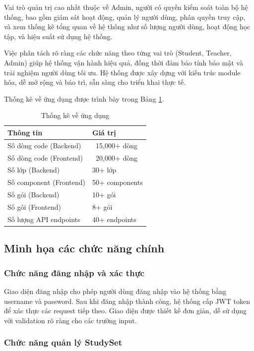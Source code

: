 \documentclass[../DoAn.tex]{subfiles}
\begin{document}
Vai trò quản trị cao nhất thuộc về Admin, người có quyền kiểm soát toàn bộ hệ thống, bao gồm giám sát hoạt động, quản lý người dùng, phân quyền truy cập, và xem thống kê tổng quan về hệ thống như số lượng người dùng, hoạt động học tập, và hiệu suất sử dụng hệ thống.

Việc phân tách rõ ràng các chức năng theo từng vai trò (Student, Teacher, Admin) giúp hệ thống vận hành hiệu quả, đồng thời đảm bảo tính bảo mật và trải nghiệm người dùng tối ưu. Hệ thống được xây dựng với kiến trúc module hóa, dễ mở rộng và bảo trì, sẵn sàng cho triển khai thực tế.

Thống kê về ứng dụng được trình bày trong Bảng \ref{table:statistics}.

\begin{table}[H]
\centering
\begin{tabular}{ll}
\hline
\textbf{Thông tin} & \textbf{Giá trị} \\ \hline
Số dòng code (Backend) & ~15,000+ dòng \\
Số dòng code (Frontend) & ~20,000+ dòng \\
Số lớp (Backend) & 30+ lớp \\
Số component (Frontend) & 50+ components \\
Số gói (Backend) & 10+ gói \\
Số gói (Frontend) & 8+ gói \\
Số lượng API endpoints & 40+ endpoints \\ \hline
\end{tabular}
\caption{Thống kê về ứng dụng}
\label{table:statistics}
\end{table}

\subsection{Minh họa các chức năng chính}
\label{subsection:4.3.3}

\subsubsection{Chức năng đăng nhập và xác thực}

Giao diện đăng nhập cho phép người dùng đăng nhập vào hệ thống bằng username và password. Sau khi đăng nhập thành công, hệ thống cấp JWT token để xác thực các request tiếp theo. Giao diện được thiết kế đơn giản, dễ sử dụng với validation rõ ràng cho các trường input.

\subsubsection{Chức năng quản lý StudySet}
\end{document}

